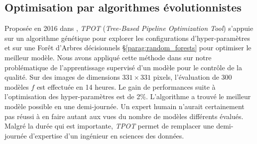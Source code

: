 \subsection{Optimisation par algorithmes évolutionnistes}
Proposée en 2016 dans \cite{olson_evaluation_2016, olson_automating_2016}, \textit{TPOT} (\textit{Tree-Based Pipeline Optimization Tool}) s'appuie sur un algorithme génétique pour explorer les configurations d'hyper-paramètres et sur une Forêt d'Arbres décisionnels §\ref{parag:random_forests} pour optimiser le meilleur modèle.
%
Nous avons appliqué cette méthode dans \cite{nagorny_polarimetric_2019} sur notre problématique de l'apprentissage supervisé d'un modèle pour le contrôle de la qualité.
Sur des images de dimensions $331 \times 331$ pixels, l'évaluation de 300 modèles $f$ est effectuée en 14 heures.
Le gain de performances suite à l'optimisation des hyper-paramètres est de 2\%.
L'algorithme a trouvé le meilleur modèle possible en une demi-journée.
Un expert humain n'aurait certainement pas réussi à en faire autant aux vues du nombre de modèles différents évalués.
Malgré la durée qui est importante, \textit{TPOT} permet de remplacer une demi-journée d'expertise d'un ingénieur en sciences des données.

%
%

